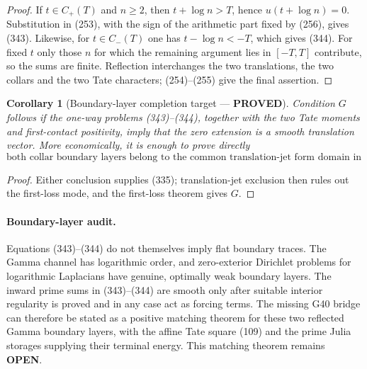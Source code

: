 \documentclass[11pt]{article}
\newtheorem{corollary}[theorem]{Corollary}
\newcommand{\PROVED}{\textcolor{green!45!black}{\textbf{PROVED}}}
\newcommand{\OPEN}{\textcolor{red!70!black}{\textbf{OPEN}}}
\begin{document}
\begin{proof}
If $t\in C_+(T)$ and $n\ge2$, then
$t+\log n>T$, hence $u(t+\log n)=0$.  Substitution in (253), with the sign
of the arithmetic part fixed by (256), gives (343).  Likewise, for
$t\in C_-(T)$ one has $t-\log n<-T$, which gives (344).  For fixed $t$ only
those $n$ for which the remaining argument lies in $[-T,T]$ contribute, so
the sums are finite.  Reflection interchanges the two translations, the two
collars and the two Tate characters; (254)--(255) give the final assertion.
\end{proof}

\begin{corollary}[Boundary-layer completion target --- \PROVED]
Condition $G$ follows if the one-way problems (343)--(344), together with
the two Tate moments and first-contact positivity, imply that the zero
extension is a smooth translation vector.  More economically, it is enough
to prove directly
\begin{equation}
 \boxed{\text{both collar boundary layers belong to the common
 translation-jet form domain in (335).}}             \tag{345}
\end{equation}
\end{corollary}

\begin{proof}
Either conclusion supplies (335); translation-jet exclusion then rules out
the first-loss mode, and the first-loss theorem gives $G$.
\end{proof}

\paragraph{Boundary-layer audit.}
Equations (343)--(344) do not themselves imply flat boundary traces.  The
Gamma channel has logarithmic order, and zero-exterior Dirichlet problems
for logarithmic Laplacians have genuine, optimally weak boundary layers.
The inward prime sums in (343)--(344) are smooth only after suitable
interior regularity is proved and in any case act as forcing terms.  The
missing G40 bridge can therefore be stated as a positive matching theorem
for these two reflected Gamma boundary layers, with the affine Tate square
(109) and the prime Julia storages supplying their terminal energy.  This
matching theorem remains \OPEN{}.
\end{document}
